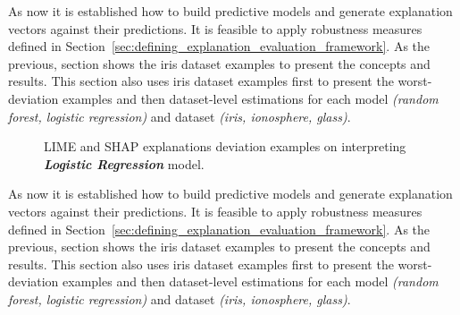 \documentclass[english]{tktltiki2}
\theoremstyle{definition}
\theoremstyle{remark}
\begin{document}
As now it is established how to build predictive models and generate explanation vectors against their predictions. It is feasible to apply robustness measures defined in Section~\ref{sec:defining_explanation_evaluation_framework}. As the previous, section shows the iris dataset examples to present the concepts and results. This section also uses iris dataset examples first to present the worst-deviation examples and then dataset-level estimations for each model \textit{(random forest, logistic regression)} and dataset \textit{(iris, ionosphere, glass)}.


\begin{figure}[htp]
	\hspace*{\fill}%
	\caption{{LIME and SHAP explanations deviation examples on interpreting \textbf{\textit{Logistic Regression}} model.}}%
	\label{fig:iris_lr_deviation_stability}%
\end{figure}



As now it is established how to build predictive models and generate explanation vectors against their predictions. It is feasible to apply robustness measures defined in Section~\ref{sec:defining_explanation_evaluation_framework}. As the previous, section shows the iris dataset examples to present the concepts and results. This section also uses iris dataset examples first to present the worst-deviation examples and then dataset-level estimations for each model \textit{(random forest, logistic regression)} and dataset \textit{(iris, ionosphere, glass)}.
\end{document}
